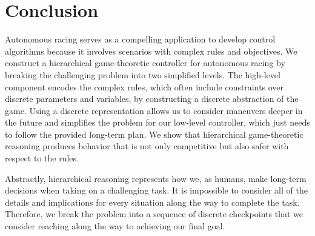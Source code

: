 \chapter{Conclusion} \label{chapter:conclusion}
Autonomous racing serves as a compelling application to develop control algorithms because it involves scenarios with complex rules and objectives. We construct a hierarchical game-theoretic controller for autonomous racing by breaking the challenging problem into two simplified levels. The high-level component encodes the complex rules, which often include constraints over discrete parameters and variables, by constructing a discrete abstraction of the game. Using a discrete representation allows us to consider maneuvers deeper in the future and simplifies the problem for our low-level controller, which just needs to follow the provided long-term plan. We show that hierarchical game-theoretic reasoning produces behavior that is not only competitive but also safer with respect to the rules. 

Abstractly, hierarchical reasoning represents how we, as humans, make long-term decisions when taking on a challenging task. It is impossible to consider all of the details and implications for every situation along the way to complete the task. Therefore, we break the problem into a sequence of discrete checkpoints that we consider reaching along the way to achieving our final goal. 

